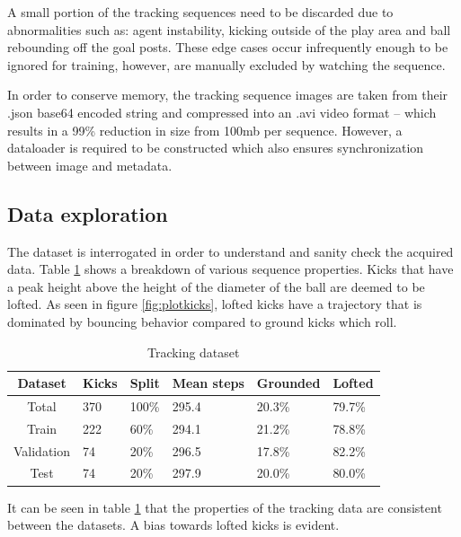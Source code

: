 \documentclass[a4paper,twoside,12pt]{report}
\begin{document}
A small portion of the tracking sequences need to be discarded due to abnormalities such as: agent instability, kicking outside of the play area and ball rebounding off the goal posts. These edge cases occur infrequently enough to be ignored for training, however, are manually excluded by watching the sequence. 

In order to conserve memory, the tracking sequence images are taken from their .json base64 encoded string and compressed into an .avi video format -- which results in a 99\% reduction in size from 100mb per sequence. However, a dataloader is required to be constructed which also ensures synchronization between image and metadata.

\subsection{Data exploration}

The dataset is interrogated in order to understand and sanity check the acquired data. Table \ref{tab:tracking} shows a breakdown of various sequence properties. Kicks that have a peak height above the height of the diameter of the ball are deemed to be lofted. As seen in figure \ref{fig:plotkicks}, lofted kicks have a trajectory that is dominated by bouncing behavior compared to ground kicks which roll.

\begin{table}[h!]
\fontsize{9.5pt}{12pt}\selectfont
\centering
\begin{tabular}{c|ll|l|ll}
{\bf Dataset}	&{\bf Kicks}	&{\bf Split}	&{\bf Mean steps}	&{\bf Grounded}	&{\bf Lofted}	\\\hline
Total			&370			&100\%			&295.4			&20.3\%			&79.7\%			\\\hline   
Train			&222			&60\%			&294.1			&21.2\%			&78.8\%			\\\hline  
Validation		&74				&20\%			&296.5			&17.8\%			&82.2\%			\\\hline  
Test			&74				&20\%			&297.9			&20.0\%			&80.0\%			\\\hline                        
\end{tabular}
\caption{Tracking dataset}
\label{tab:tracking}
\end{table}

It can be seen in table \ref{tab:tracking} that the properties of the tracking data are consistent between the datasets. A bias towards lofted kicks is evident.
\end{document}

